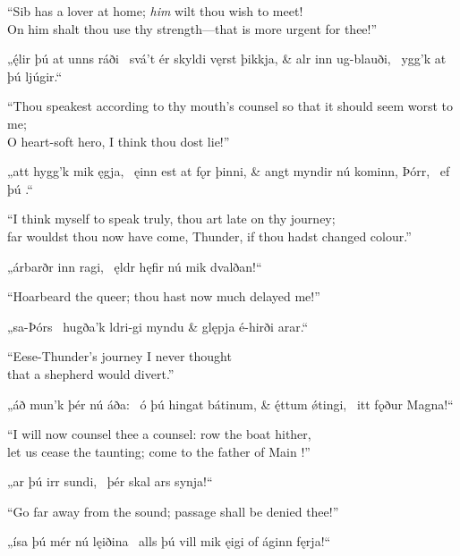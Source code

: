 \bvb “Sib has a lover at home; \emph{him} wilt thou wish to meet! \\
On him shalt thou use thy strength—that is more urgent for thee!”\evb\evg


\bvg\bva{}„ę́lir þú at unns ráði \hld\ svá’t ér skyldi vęrst þikkja, &
alr inn ug-blauði, \hld\ ygg’k at þú ljúgir.“\eva

\bvb “Thou speakest according to thy mouth’s counsel so that it should seem worst to me; \\
O heart-soft hero, I think thou dost lie!”\evb\evg


\bvg\bva{}„att hygg’k mik ęgja, \hld\ ęinn est at fǫr þinni, &
angt myndir nú kominn, Þórr, \hld\ ef þú .“\eva

\bvb “I think myself to speak truly, thou art late on thy journey; \\
far wouldst thou now have come, Thunder, if thou hadst changed colour.”\evb\evg


\bvg\bva{}„árbarðr inn ragi, \hld\ ęldr hęfir nú mik dvalðan!“\eva

\bvb “Hoarbeard the queer; thou hast now much delayed me!”\evb\evg


\bvg\bva{}„sa-Þórs \hld\ hugða’k ldri-gi myndu &
\ind glępja é-hirði arar.“\eva

\bvb “Eese-Thunder’s journey I never thought \\
\ind that a shepherd would divert.”\evb\evg


\bvg\bva{}„áð mun’k þér nú áða: \hld\ ó þú hingat bátinum, &
ę́ttum ǿtingi, \hld\ itt fǫður Magna!“\eva

\bvb “I will now counsel thee a counsel: row the boat hither, \\
let us cease the taunting; come to the father of Main !”\evb\evg


\bvg\bva{}„ar þú irr sundi, \hld\ þér skal ars synja!“\eva

\bvb “Go far away from the sound; passage shall be denied thee!”\evb\evg


\bvg\bva{}„ísa þú mér nú lęiðina \hld\ alls þú vill mik ęigi of áginn fęrja!“\eva

